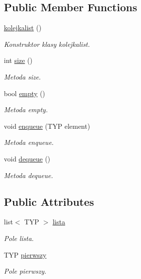 \subsection*{Public Member Functions}
\begin{DoxyCompactItemize}
\item 
\hyperlink{classkolejkalist_a90513e8c4cc0551dbe4e7d6bc2bbc1ee}{kolejkalist} ()
\begin{DoxyCompactList}\small\item\em Konstruktor klasy kolejkalist. \end{DoxyCompactList}\item 
int \hyperlink{classkolejkalist_a9ebc4dc0f552161532501b6e7d6483ae}{size} ()
\begin{DoxyCompactList}\small\item\em Metoda size. \end{DoxyCompactList}\item 
bool \hyperlink{classkolejkalist_a5cfccf441eb0fab70fb7f03d1f5edc23}{empty} ()
\begin{DoxyCompactList}\small\item\em Metoda empty. \end{DoxyCompactList}\item 
void \hyperlink{classkolejkalist_adda98f8350ae43dbef3367e2f0d90735}{enqueue} (T\-Y\-P element)
\begin{DoxyCompactList}\small\item\em Metoda enqueue. \end{DoxyCompactList}\item 
void \hyperlink{classkolejkalist_a06f0c76eb9579d6dd76ff354f2c16b1c}{dequeue} ()
\begin{DoxyCompactList}\small\item\em Metoda dequeue. \end{DoxyCompactList}\end{DoxyCompactItemize}
\subsection*{Public Attributes}
\begin{DoxyCompactItemize}
\item 
list$<$ T\-Y\-P $>$ \hyperlink{classkolejkalist_a303c82cb7875fd2779679a0e937900c0}{lista}
\begin{DoxyCompactList}\small\item\em Pole lista. \end{DoxyCompactList}\item 
T\-Y\-P \hyperlink{classkolejkalist_a62f458a961a2179f5c8977bae73fe42b}{pierwszy}
\begin{DoxyCompactList}\small\item\em Pole pierwszy. \end{DoxyCompactList}\end{DoxyCompactItemize}


